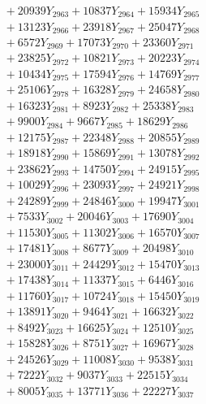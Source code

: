 \documentclass[a4paper,10pt]{article}
\begin{document}
{\begin{align}
&\;  + 20939 Y_{2963} + 10837 Y_{2964} + 15934 Y_{2965} \\[0.3ex]
&\;  + 13123 Y_{2966} + 23918 Y_{2967} + 25047 Y_{2968} \\[0.5ex]\allowbreak
&\;  + 6572 Y_{2969} + 17073 Y_{2970} + 23360 Y_{2971} \\[0.3ex]
&\;  + 23825 Y_{2972} + 10821 Y_{2973} + 20223 Y_{2974} \\[0.3ex]
&\;  + 10434 Y_{2975} + 17594 Y_{2976} + 14769 Y_{2977} \\[0.3ex]
&\;  + 25106 Y_{2978} + 16328 Y_{2979} + 24658 Y_{2980} \\[0.3ex]
&\;  + 16323 Y_{2981} + 8923 Y_{2982} + 25338 Y_{2983} \\[0.3ex]
&\;  + 9900 Y_{2984} + 9667 Y_{2985} + 18629 Y_{2986} \\[0.3ex]
&\;  + 12175 Y_{2987} + 22348 Y_{2988} + 20855 Y_{2989} \\[0.3ex]
&\;  + 18918 Y_{2990} + 15869 Y_{2991} + 13078 Y_{2992} \\[0.3ex]
&\;  + 23862 Y_{2993} + 14750 Y_{2994} + 24915 Y_{2995} \\[0.3ex]
&\;  + 10029 Y_{2996} + 23093 Y_{2997} + 24921 Y_{2998} \\[0.5ex]\allowbreak
&\;  + 24289 Y_{2999} + 24846 Y_{3000} + 19947 Y_{3001} \\[0.3ex]
&\;  + 7533 Y_{3002} + 20046 Y_{3003} + 17690 Y_{3004} \\[0.3ex]
&\;  + 11530 Y_{3005} + 11302 Y_{3006} + 16570 Y_{3007} \\[0.3ex]
&\;  + 17481 Y_{3008} + 8677 Y_{3009} + 20498 Y_{3010} \\[0.3ex]
&\;  + 23000 Y_{3011} + 24429 Y_{3012} + 15470 Y_{3013} \\[0.3ex]
&\;  + 17438 Y_{3014} + 11337 Y_{3015} + 6446 Y_{3016} \\[0.3ex]
&\;  + 11760 Y_{3017} + 10724 Y_{3018} + 15450 Y_{3019} \\[0.3ex]
&\;  + 13891 Y_{3020} + 9464 Y_{3021} + 16632 Y_{3022} \\[0.3ex]
&\;  + 8492 Y_{3023} + 16625 Y_{3024} + 12510 Y_{3025} \\[0.3ex]
&\;  + 15828 Y_{3026} + 8751 Y_{3027} + 16967 Y_{3028} \\[0.5ex]\allowbreak
&\;  + 24526 Y_{3029} + 11008 Y_{3030} + 9538 Y_{3031} \\[0.3ex]
&\;  + 7222 Y_{3032} + 9037 Y_{3033} + 22515 Y_{3034} \\[0.3ex]
&\;  + 8005 Y_{3035} + 13771 Y_{3036} + 22227 Y_{3037} \\[0.3ex]

\end{align}}
\end{document}
